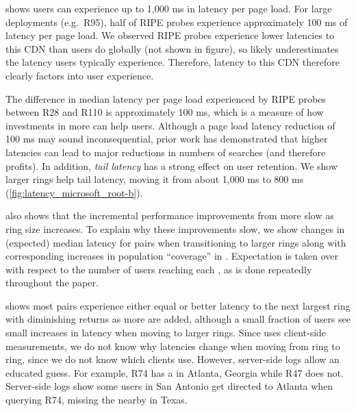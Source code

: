 \documentclass[sigconf,letterpaper,nonacm,10pt,anonymous]{acmart}
\begin{document}
 shows users can experience up to
1,000 ms in latency per page load. For large deployments (e.g.~R95),
half of RIPE probes experience approximately 100 ms of latency per page
load. We observed RIPE probes experience lower latencies to this CDN
than users do globally (not shown in figure), so
 likely underestimates the latency
users typically experience. Therefore, latency to this CDN therefore
clearly factors into user experience.

The difference in median latency per page load experienced by RIPE
probes between R28 and R110 is approximately 100 ms, which is a measure
of how investments in more \feplural can help users. Although a page
load latency reduction of 100 ms may sound inconsequential, prior work
has demonstrated that higher latencies can lead to major reductions in
numbers of searches \cite{brutlag2009speed} (and therefore profits). In
addition, \emph{tail latency} has a strong effect on user retention. We
show larger rings help tail latency, moving it from about 1,000 ms to
800 ms (\cref{fig:latency_microsoft_root-b}).

 also shows that the incremental
performance improvements from more \feplural slow as ring size
increases. To explain why these improvements slow, we show changes in
(expected) median latency for \metroas pairs when transitioning to
larger rings along with corresponding increases in population
``coverage'' in .
Expectation is taken over \feplural with respect to the number of users
reaching each \fe, as is done repeatedly throughout the paper.

 shows most
\metroas pairs experience either equal or better latency to the next
largest ring with diminishing returns as more \feplural are added,
although a small fraction of users see small increases in latency when
moving to larger rings. Since
 uses client-side
measurements, we do not know why latencies change when moving from ring
to ring, since we do not know which \feplural clients use. However,
server-side logs allow an educated guess. For example, R74 has a \fe in
Atlanta, Georgia while R47 does not. Server-side logs show some users in
San Antonio get directed to Atlanta when querying R74, missing the
nearby \feplural in Texas.
\end{document}
